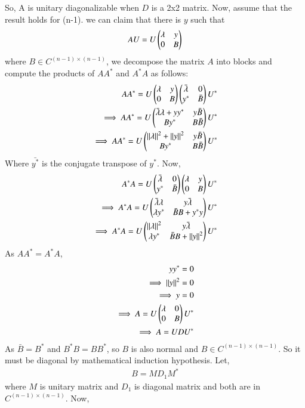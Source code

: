\documentclass[journal,12pt,twocolumn]{IEEEtran}
\begin{document}
So, A is unitary diagonalizable when $D$ is a 2x2 matrix.
Now, assume that the result holds for (n-1). we can claim that there is $y$ such that 
\begin{align}
AU = U\begin{pmatrix}\lambda & y\\0 & B\end{pmatrix}
\end{align}
where $B \in C^{(n-1)\times(n-1)}$, we decompose the matrix $A$ into blocks and compute the products of $A A^*$ and $A^* A$ as follows:
\begin{align}
A A^* =  U \begin{pmatrix}\lambda & y\\0 & B\end{pmatrix}\begin{pmatrix}\bar{\lambda} & 0\\y^* & \bar{B}\end{pmatrix}U^*\\
\implies A A^* =  U \begin{pmatrix}\bar{\lambda}\lambda + yy^* & y\bar{B}\\By^* & B\bar{B}\end{pmatrix} U^*\\
\implies A A^* = U \begin{pmatrix}\left\lVert\lambda\right\rVert^2 + \left\lVert y\right\rVert^2 & y \bar{B}\\By^* & B\bar{B}\end{pmatrix} U^*
\end{align}
Where $\bar{y^*}$ is the conjugate transpose of $y^*$.
Now,
\begin{align}
A^* A = U \begin{pmatrix}\bar{\lambda} & 0\\y^* & \bar{B}\end{pmatrix}\begin{pmatrix}\lambda & y\\0 & B\end{pmatrix}U^*\\
\implies A^* A =  U \begin{pmatrix}\bar{\lambda}\lambda & y \bar{\lambda}\\\lambda y^* & \bar{B}B + y^*y\end{pmatrix} U^*\\
\implies A^* A =U \begin{pmatrix}\left\lVert\lambda\right\rVert^2 & y \bar{\lambda}\\\lambda y^* & \bar{B}B + \left\lVert y\right\rVert^2\end{pmatrix} U^*
\end{align}
As $A A^* = A^* A$, 
\begin{align}
y y^* = 0\\
\implies \left\lVert y\right\rVert^2 = 0\\
\implies y =0\\
\implies A = U \begin{pmatrix}\lambda & 0\\0 & B\end{pmatrix} U^*\\
\implies A = U D U^*
\end{align}
As $\bar{B} = B^*$ and $B^* B = B B^*$, so $B$ is also normal and $B \in C^{(n-1)\times(n-1)}$. So it must be diagonal by mathematical induction hypothesis.
Let, 
\begin{align}
B = M D_1 M^*
\end{align}
where $M$ is unitary matrix and $D_1$ is diagonal matrix and both are in $C^{(n-1)\times(n-1)}$.
Now,
\end{document}
